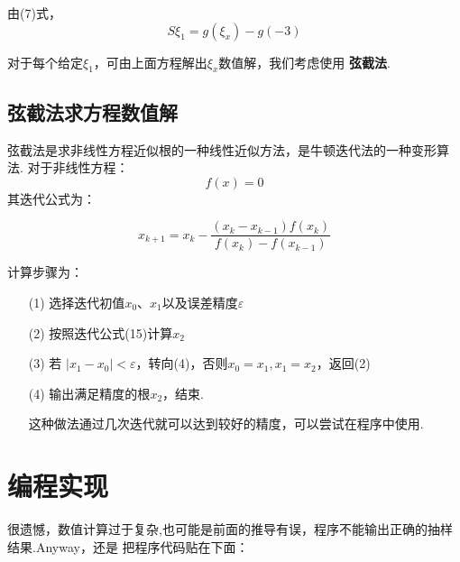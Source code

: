 \documentclass[12pt,a4paper,utf8]{ctexart}
\begin{document}
由(7)式，
\begin{equation}    
    S \xi_1 = g(\xi_x) -g(-3)
\end{equation}


对于每个给定$\xi_1$，可由上面方程解出$\xi_x$数值解，我们考虑使用 \textbf{弦截法}.

\subsection{弦截法求方程数值解}

弦截法是求非线性方程近似根的一种线性近似方法，是牛顿迭代法的一种变形算法.
对于非线性方程：
\begin{equation}
    f(x) = 0
\end{equation}
其迭代公式为：

\begin{equation}
    x_{k + 1} = x_k - \frac{(x_k - x_{k-1})f(x_k)}{f(x_k) - f(x_{k-1})}
\end{equation}

计算步骤为：
\begin{enumerate}
    \item[(1)] 选择迭代初值$x_0$、$x_1$以及误差精度$\varepsilon$

    \item[(2)] 按照迭代公式(15)计算$x_2$

    \item[(3)] 若 $|x_1 - x_0| < \varepsilon$，转向(4)，否则$x_0 = x_1,x_1 =
        x_2$，返回(2)

    \item[(4)] 输出满足精度的根$x_2$，结束.

这种做法通过几次迭代就可以达到较好的精度，可以尝试在程序中使用.

\end{enumerate}
\section{编程实现}

很遗憾，数值计算过于复杂,也可能是前面的推导有误，程序不能输出正确的抽样结果.Anyway，还是
把程序代码贴在下面：
\end{document}
